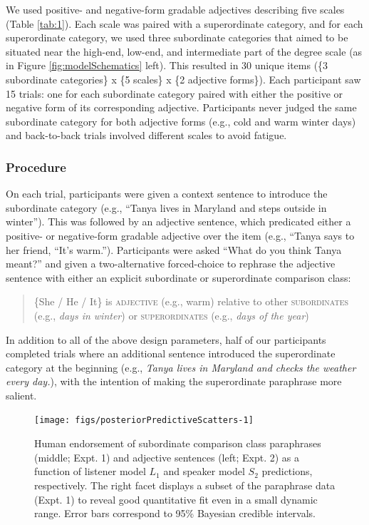 \documentclass[doc]{apa6}
\begin{document}
We used positive- and negative-form gradable adjectives describing five
scales (Table \ref{tab:1}). Each scale was paired with a superordinate
category, and for each superordinate category, we used three subordinate
categories that aimed to be situated near the high-end, low-end, and
intermediate part of the degree scale (as in Figure
\ref{fig:modelSchematics} left). This resulted in 30 unique items (\{3
subordinate categories\} x \{5 scales\} x \{2 adjective forms\}). Each
participant saw 15 trials: one for each subordinate category paired with
either the positive or negative form of its corresponding adjective.
Participants never judged the same subordinate category for both
adjective forms (e.g., cold and warm winter days) and back-to-back
trials involved different scales to avoid fatigue.


\subsubsection{Procedure}

On each trial, participants were given a context sentence to introduce
the subordinate category (e.g., ``Tanya lives in Maryland and
steps outside in winter''). This was followed by an adjective sentence,
which predicated either a positive- or negative-form gradable adjective
over the item (e.g., ``Tanya says to her friend, ``It's
warm.''). Participants were asked ``What do you think Tanya
meant?'' and given a two-alternative forced-choice to rephrase the
adjective sentence with either an explicit subordinate or superordinate
comparison class:

\begin{quote}
\{She / He / It\} is \textsc{adjective} (e.g., warm) relative to other
\textsc{subordinates} (e.g., \emph{days in winter}) or
\textsc{superordinates} (e.g., \emph{days of the year})
\end{quote}

In addition to all of the above design parameters, half of our
participants completed trials where an additional sentence introduced
the superordinate category at the beginning (e.g., \emph{Tanya lives in
Maryland and checks the weather every day.}), with the intention of
making the superordinate paraphrase more salient.

\begin{figure}[htb]

{\centering \texttt{[image: figs/posteriorPredictiveScatters-1]} 

}

\caption{Human endorsement of subordinate comparison class paraphrases (middle; Expt. 1) and adjective sentences (left; Expt. 2) as a function of listener model $L_1$ and speaker model $S_2$ predictions, respectively. The right facet displays a subset of the paraphrase data (Expt. 1) to reveal good quantitative fit even in a small dynamic range. Error bars correspond to 95\% Bayesian credible intervals.}\label{fig:posteriorPredictiveScatters}
\end{figure}
\end{document}
